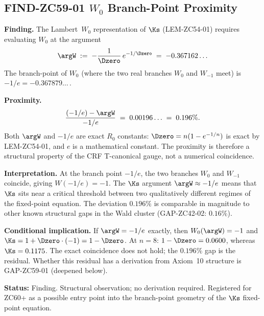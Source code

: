 \documentclass[12pt, a4paper]{article}
\begin{document}
\subsection{FIND-ZC59-01 \quad $W_0$ Branch-Point Proximity}
\label{sec:find01}


\begin{derivedbox}[title={FIND-ZC59-01: Lambert $W_0$ Argument
  Lies Near $-1/e$ (Structural Observation, $R_0$)}]
\textbf{Finding.}
The Lambert~$W_0$ representation of $\Ks$ (LEM-ZC54-01) requires
evaluating $W_0$ at the argument
\begin{equation}\label{eq:argW}
  \argW
  \;:=\; -\frac{1}{\Dzero}\,e^{-1/\Dzero}
  \;=\; -0.367162\ldots
\end{equation}
The branch-point of $W_0$ (where the two real branches $W_0$
and $W_{-1}$ meet) is $-1/e = -0.367879\ldots$\,.

\textbf{Proximity.}
\[
  \frac{(-1/e) - \argW}{-1/e}
  \;=\; 0.00196\ldots
  \;=\; 0.196\%.
\]
Both $\argW$ and $-1/e$ are exact $R_0$ constants: $\Dzero =
n(1-e^{-1/n})$ is exact by LEM-ZC54-01, and $e$ is a
mathematical constant.  The proximity is therefore a structural
property of the CRF T-canonical gauge, not a numerical
coincidence.

\textbf{Interpretation.}
At the branch point $-1/e$, the two branches $W_0$ and $W_{-1}$
coincide, giving $W(-1/e) = -1$.  The $\Ks$ argument
$\argW \approx -1/e$ means that $\Ks$ sits near a critical
threshold between two qualitatively different regimes of the
fixed-point equation.  The deviation $0.196\%$ is comparable
in magnitude to other known structural gaps in the Wald
cluster (GAP-ZC42-02: $0.16\%$).

\textbf{Conditional implication.}
If $\argW = -1/e$ exactly, then $W_0(\argW) = -1$ and
$\Ks = 1 + \Dzero \cdot(-1) = 1 - \Dzero$.  At $n=8$:
$1-\Dzero = 0.0600$, whereas $\Ks = 0.1175$.  The exact
coincidence does not hold; the $0.196\%$ gap is the residual.
Whether this residual has a derivation from Axiom~10 structure
is GAP-ZC59-01 (deepened below).

\textbf{Status:} Finding.  Structural observation; no derivation
required.  Registered for ZC60+ as a possible entry point into
the branch-point geometry of the $\Ks$ fixed-point equation.
\end{derivedbox}

\end{document}
